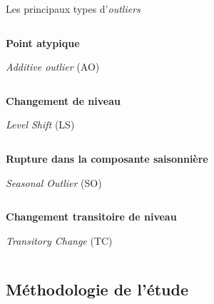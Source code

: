 \documentclass[10pt,xcolor=table,color={dvipsnames,usenames},ignorenonframetext,usepdftitle=false,french]{beamer}
\begin{document}
\begin{frame}{Les principaux types d'\emph{outliers}}

\smallskip

\begin{columns}
\begin{column}{0.6\textwidth}
\textbf{Point atypique}

\emph{Additive outlier} (AO)
\end{column}
\begin{column}{0.3\textwidth}

\end{column}
\end{columns}

\begin{columns}
\begin{column}{0.6\textwidth}
\textbf{Changement de niveau}

\emph{Level Shift} (LS)
\end{column}
\begin{column}{0.3\textwidth}

\end{column}
\end{columns}

\begin{columns}
\begin{column}{0.6\textwidth}
\textbf{Rupture dans la composante saisonnière}

\emph{Seasonal Outlier} (SO) 
\end{column}
\begin{column}{0.3\textwidth}

\end{column}
\end{columns}

\begin{columns}
\begin{column}{0.6\textwidth}
\textbf{Changement transitoire de niveau}

\emph{Transitory Change} (TC) 
\end{column}
\begin{column}{0.3\textwidth}

\end{column}
\end{columns}

\end{frame}

\subsection{Méthodologie de l'étude}\label{methodologie-de-letude-1}
\end{document}
